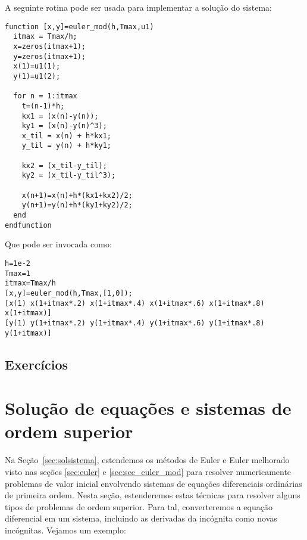\begin{resol}
\fi


\ifisscilab
A seguinte rotina pode ser usada para implementar a solução do sistema:
\begin{verbatim}
function [x,y]=euler_mod(h,Tmax,u1)
  itmax = Tmax/h;
  x=zeros(itmax+1);
  y=zeros(itmax+1);
  x(1)=u1(1);
  y(1)=u1(2);

  for n = 1:itmax
    t=(n-1)*h;
    kx1 = (x(n)-y(n));
    ky1 = (x(n)-y(n)^3);
    x_til = x(n) + h*kx1;
    y_til = y(n) + h*ky1;

    kx2 = (x_til-y_til);
    ky2 = (x_til-y_til^3);

    x(n+1)=x(n)+h*(kx1+kx2)/2;
    y(n+1)=y(n)+h*(ky1+ky2)/2;
  end
endfunction
\end{verbatim}
Que pode ser invocada como:
\begin{verbatim}
h=1e-2
Tmax=1
itmax=Tmax/h
[x,y]=euler_mod(h,Tmax,[1,0]);
[x(1) x(1+itmax*.2) x(1+itmax*.4) x(1+itmax*.6) x(1+itmax*.8) x(1+itmax)]
[y(1) y(1+itmax*.2) y(1+itmax*.4) y(1+itmax*.6) y(1+itmax*.8) y(1+itmax)]
 \end{verbatim}
\fi
\end{resol}

\subsection*{Exercícios}

\construirExer


\section{Solução de equações e sistemas de ordem superior}

Na Seção~\ref{sec:solsistema}, estendemos os métodos de Euler e Euler melhorado visto nas seções \ref{sec:euler} e \ref{sec:sec_euler_mod} para resolver numericamente problemas de valor inicial envolvendo sistemas de equações diferenciais ordinárias de primeira ordem. Nesta seção, estenderemos estas técnicas para resolver alguns tipos de problemas de ordem superior. Para tal, converteremos a equação diferencial em um sistema, incluindo as derivadas da incógnita como novas incógnitas. Vejamos um exemplo:

